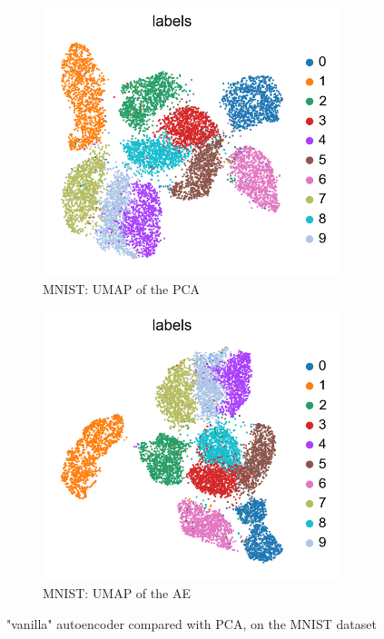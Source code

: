 \documentclass[11pt, a4paper]{report}
\theoremstyle{plain}
\theoremstyle{definition}
\theoremstyle{remark}
\begin{document}
\begin{figure}[!h]
\begin{framed}
\centering
\begin{subfigure}[t]{0.45\textwidth}
\includegraphics[width=0.95\textwidth]{images/pca.umap.mnist.png}
\caption{MNIST: UMAP of the PCA}
\end{subfigure}
\begin{subfigure}[t]{0.45\textwidth}
\includegraphics[width=0.95\textwidth]{images/ae.umap.mnist.png}
\caption{MNIST: UMAP of the AE}
\end{subfigure}
\end{framed}
\caption{"vanilla" autoencoder compared with PCA, on the MNIST dataset}
\label{fig:pcavae}
\end{figure}
\end{document}
